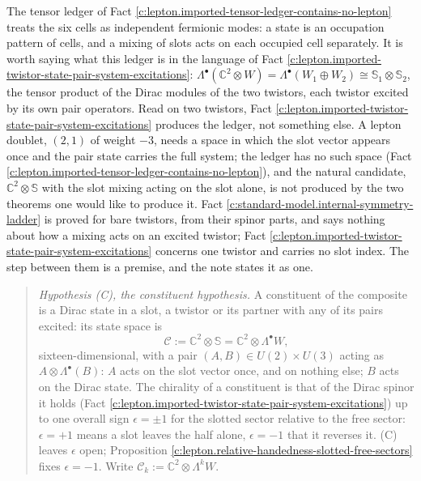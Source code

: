 \documentclass[11pt]{article}
\theoremstyle{definition}
\theoremstyle{plain}
\providecommand{\C}{}\renewcommand{\C}{\mathbb{C}}
\providecommand{\Con}{}\renewcommand{\Con}{\mathcal{C}}
\providecommand{\Sp}{}\renewcommand{\Sp}{\mathbb{S}}
\begin{document}
\label{c:note.lepton.setting-constituent-space-hypothesis-holds-lepton}
The tensor ledger of Fact \ref{c:lepton.imported-tensor-ledger-contains-no-lepton} treats the six cells as independent fermionic modes: a state is an occupation pattern of cells, and a mixing of slots acts on each occupied cell separately. It is worth saying what this ledger is in the language of Fact \ref{c:lepton.imported-twistor-state-pair-system-excitations}: $\Lambda^{\bullet}(\C^{2} \otimes W) = \Lambda^{\bullet}(W_{1} \oplus W_{2}) \cong \Sp_{1} \otimes \Sp_{2}$, the tensor product of the Dirac modules of the two twistors, each twistor excited by its own pair operators. Read on two twistors, Fact \ref{c:lepton.imported-twistor-state-pair-system-excitations} produces the ledger, not something else. A lepton doublet, $(2,1)$ of weight $-3$, needs a space in which the slot vector appears once and the pair state carries the full system; the ledger has no such space (Fact \ref{c:lepton.imported-tensor-ledger-contains-no-lepton}), and the natural candidate, $\C^{2} \otimes \Sp$ with the slot mixing acting on the slot alone, is not produced by the two theorems one would like to produce it. Fact \ref{c:standard-model.internal-symmetry-ladder} is proved for bare twistors, from their spinor parts, and says nothing about how a mixing acts on an excited twistor; Fact \ref{c:lepton.imported-twistor-state-pair-system-excitations} concerns one twistor and carries no slot index. The step between them is a premise, and the note states it as one.

\begin{quote}
\emph{Hypothesis (C), the constituent hypothesis.} A constituent of the composite is a Dirac state in a slot, a twistor or its partner with any of its pairs excited: its state space is
\[
\Con := \C^{2} \otimes \Sp = \C^{2} \otimes \Lambda^{\bullet}W,
\]
sixteen-dimensional, with a pair $(A, B) \in U(2) \times U(3)$ acting as $A \otimes \Lambda^{\bullet}(B)$: $A$ acts on the slot vector once, and on nothing else; $B$ acts on the Dirac state. The chirality of a constituent is that of the Dirac spinor it holds (Fact \ref{c:lepton.imported-twistor-state-pair-system-excitations}) up to one overall sign $\epsilon = \pm 1$ for the slotted sector relative to the free sector: $\epsilon = +1$ means a slot leaves the half alone, $\epsilon = -1$ that it reverses it. (C) leaves $\epsilon$ open; Proposition \ref{c:lepton.relative-handedness-slotted-free-sectors} fixes $\epsilon = -1$. Write $\Con_{k} := \C^{2} \otimes \Lambda^{k}W$.
\end{quote}
\end{document}
